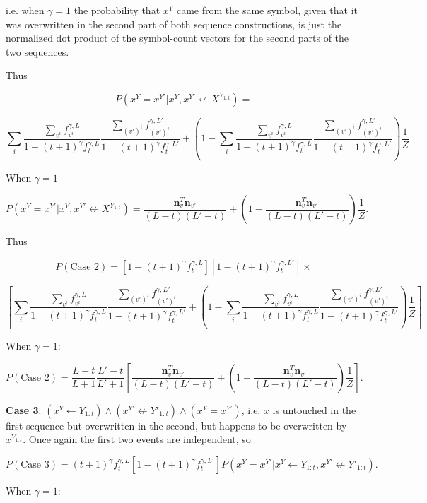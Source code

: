 \documentclass{article}
\begin{document}
i.e. when $\gamma = 1$ the probability that $x^Y$ came from the same symbol, given that it was overwritten in the second part of both sequence constructions, is just the normalized dot product of the symbol-count vectors for the second parts of the two sequences.

Thus

$$P(x^Y = x^{Y'}|x^Y, x^{Y'} \not\leftarrow X^{Y_{1:t}}) = $$

$$\sum_i \frac{\sum\limits_{v^i} f^{\gamma,L}_{v^i}}{1 - (t+1)^\gamma f^{\gamma,L}_t} \frac{\sum\limits_{(v')^i} f^{\gamma,L'}_{(v')^i}}{1 - (t+1)^\gamma f^{\gamma,L'}_t} + \left(1 - \sum_i \frac{\sum\limits_{v^i} f^{\gamma,L}_{v^i}}{1 - (t+1)^\gamma f^{\gamma,L}_t} \frac{\sum\limits_{(v')^i} f^{\gamma,L'}_{(v')^i}}{1 - (t+1)^\gamma f^{\gamma,L'}_t}\right)\frac{1}{Z}$$

When $\gamma = 1$

$$P(x^Y = x^{Y'}|x^Y, x^{Y'} \not\leftarrow X^{Y_{1:t}}) = \frac{\mathbf{n}^T_v\mathbf{n}_{v'}}{(L-t)(L'-t)} + \left(1 - \frac{\mathbf{n}^T_v\mathbf{n}_{v'}}{(L-t)(L'-t)} \right)\frac{1}{Z}.$$

Thus

$$P(\textrm{Case 2}) = [1 - (t+1)^\gamma f^{\gamma,L}_t][1 - (t+1)^\gamma f^{\gamma,L'}_t] \times$$

$$\left[
\sum_i \frac{\sum\limits_{v^i} f^{\gamma,L}_{v^i}}{1 - (t+1)^\gamma f^{\gamma,L}_t} \frac{\sum\limits_{(v')^i} f^{\gamma,L'}_{(v')^i}}{1 - (t+1)^\gamma f^{\gamma,L'}_t} + \left(1 - \sum_i \frac{\sum\limits_{v^i} f^{\gamma,L}_{v^i}}{1 - (t+1)^\gamma f^{\gamma,L}_t} \frac{\sum\limits_{(v')^i} f^{\gamma,L'}_{(v')^i}}{1 - (t+1)^\gamma f^{\gamma,L'}_t}\right)\frac{1}{Z}
\right]$$

When $\gamma = 1$:

$$P(\textrm{Case 2}) = \frac{L-t}{L+1}\frac{L'-t}{L'+1}\left[\frac{\mathbf{n}^T_v\mathbf{n}_{v'}}{(L-t)(L'-t)} + \left(1 - \frac{\mathbf{n}^T_v\mathbf{n}_{v'}}{(L-t)(L'-t)} \right)\frac{1}{Z}\right].$$

\textbf{Case 3}: $(x^Y \leftarrow Y_{1:t}) \land (x^{Y'} \not\leftarrow Y'_{1:t}) \land (x^Y = x^{Y'})$, i.e. $x$ is untouched in the first sequence but overwritten in the second, but happens to be overwritten by $x^{Y_{1:t}}$. Once again the first two events are independent, so 

$$P(\textrm{Case 3}) = (t+1)^\gamma f^{\gamma,L}_t[1-(t+1)^\gamma f^{\gamma,L'}_t]P(x^Y = x^{Y'}|x^Y \leftarrow Y_{1:t}, x^{Y'} \not\leftarrow Y'_{1:t}).$$

When $\gamma = 1$:
\end{document}
